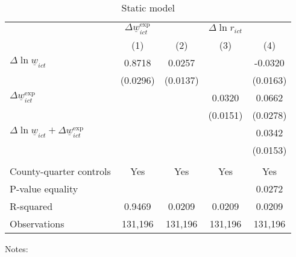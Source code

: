 \begin{table}[hbt!] \centering
    \caption{Static model}
    \label{tab:static}

    \begin{tabular}{l*{4}{c}}
    \toprule
     & \multicolumn{1}{c}{$\Delta \underline{w}_{ict}^{\text{exp}}$}
     & \multicolumn{3}{c}{$\Delta \ln r_{ict}$}                                  \\ \cmidrule(lr){2-2}\cmidrule(lr){3-5}
     & \multicolumn{1}{c}{(1)} & \multicolumn{1}{c}{(2)} 
     & \multicolumn{1}{c}{(3)} & \multicolumn{1}{c}{(4)}                         \\ \midrule
    $\Delta \ln \underline{w}_{ict}$          &  0.8718  &  0.0257  &       &  -0.0320     \\
                                              & (0.0296) & (0.0137) &       & (0.0163)    \\
    $\Delta \underline{w}_{ict}^{\text{exp}}$ &       &       &  0.0320  & 0.0662      \\
                                              &       &       & (0.0151) & (0.0278)    \\ \midrule
    $\Delta \ln \underline{w}_{ict}+
      \Delta \underline{w}_{ict}^{\text{exp}}$&       &       &       &  0.0342     \\
                                              &       &       &       & (0.0153)    \\
                                              &       &       &       &          \\ \midrule
    County-quarter controls                   &  Yes  & Yes   & Yes   & Yes      \\
    P-value equality                          &       &       &       & 0.0272      \\
    R-squared                                 &  0.9469  &  0.0209  &  0.0209  & 0.0209      \\
    Observations                              & 131,196  & 131,196  & 131,196  & 131,196     \\\bottomrule
    \end{tabular}

    \begin{minipage}{.95\textwidth} \footnotesize
        \vspace{2mm}
        Notes: 
    \end{minipage}
\end{table}
